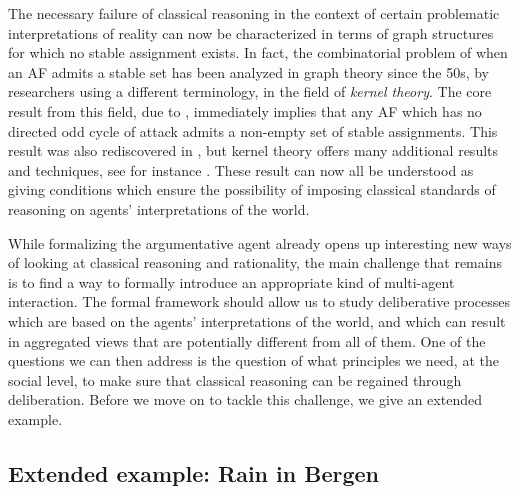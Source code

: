 \documentclass[greybox]{svmult}
\newcommand{\sem}{\varepsilon}
\begin{document}
The necessary failure of classical reasoning in the context of certain problematic interpretations of reality can now be characterized in terms of graph structures for which no stable assignment exists. 
In fact, the combinatorial problem of when an AF admits a stable set has been analyzed in graph theory since the 50s, by researchers using a different terminology, in the field of \emph{kernel theory}. The core result from this field, due to \cite{richardson}, immediately implies that any AF which has no directed odd cycle of attack admits a non-empty set of stable assignments. This result was also rediscovered in \cite{dung}, but kernel theory offers many additional results and techniques, see for instance \cite{sanches}. These result can now all be understood as giving conditions which ensure the possibility of imposing classical standards of reasoning on agents' interpretations of the world.
%
%
%
%
%
%

While formalizing the argumentative agent already opens up interesting new ways of looking at classical reasoning and rationality, the main challenge that remains is to find a way to formally introduce an appropriate kind of multi-agent interaction. The formal framework should allow us to study deliberative processes which are based on the agents' interpretations of the world, and which can result in aggregated views that are potentially different from all of them. One of the questions we can then address is the question of what principles we need, at the social level, to make sure that classical reasoning can be regained through deliberation. Before we move on to tackle this challenge, we give an extended example.

\subsection{Extended example: Rain in Bergen}\label{ex:run}
\end{document}

